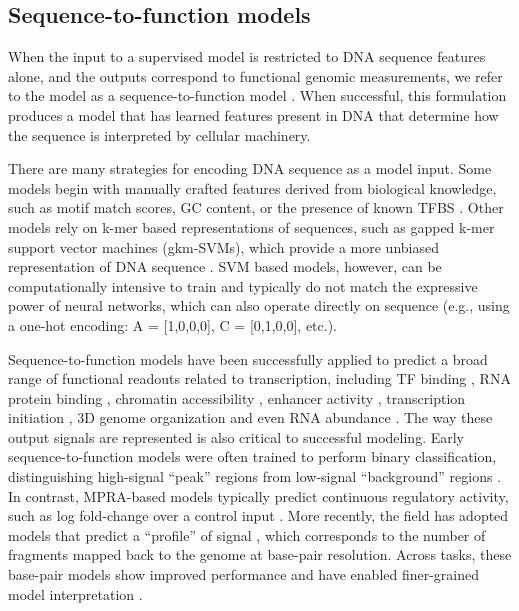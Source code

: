 \begin{dissertationintroduction}
\subsection{Sequence-to-function models}

When the input to a supervised model is restricted to DNA sequence features alone, and the outputs correspond to functional genomic measurements, we refer to the model as a sequence-to-function model \cite{Sasse2024-ly}. When successful, this formulation produces a model that has learned features present in DNA that determine how the sequence is interpreted by cellular machinery.

There are many strategies for encoding DNA sequence as a model input. Some models begin with manually crafted features derived from biological knowledge, such as motif match scores, GC content, or the presence of known TFBS \cite{De_Boer2020-mw}. Other models rely on k-mer based representations of sequences, such as gapped k-mer support vector machines (gkm-SVMs), which provide a more unbiased representation of DNA sequence \cite{Ghandi2014-hn}. SVM based models, however, can be computationally intensive to train and typically do not match the expressive power of neural networks, which can also operate directly on sequence (e.g., using a one-hot encoding: A = [1,0,0,0], C = [0,1,0,0], etc.). 

Sequence-to-function models have been successfully applied to predict a broad range of functional readouts related to transcription, including TF binding \cite{Avsec2021-sw}, RNA protein binding \cite{Horlacher2022-ja}, chromatin accessibility \cite{Pampari2025-lm}, enhancer activity \cite{De_Almeida2022-aa,Gosai2023-cw}, transcription initiation \cite{Cochran2024-ab}, 3D genome organization \cite{Fudenberg2020-gs} and even RNA abundance \cite{Linder2025-or}. The way these output signals are represented is also critical to successful modeling. Early sequence-to-function models were often trained to perform binary classification, distinguishing high-signal “peak” regions from low-signal “background” regions \cite{Zhou2015-rk}. In contrast, MPRA-based models typically predict continuous regulatory activity, such as log fold-change over a control input \cite{De_Almeida2022-aa}. More recently, the field has adopted models that predict a “profile” of signal \cite{Schreiber2021-vf}, which corresponds to the number of fragments mapped back to the genome at base-pair resolution. Across tasks, these base-pair models show improved performance and have enabled finer-grained model interpretation \cite{Avsec2021-sw,Pampari2025-lm}.


\end{dissertationintroduction}
